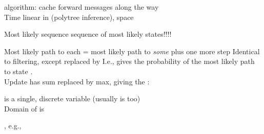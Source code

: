 \documentclass{article}
\begin{document}
\begin{huge}
\vspace*{0.01in}

\textwidth
{}

 algorithm: cache forward messages along the way\\
Time linear in  (polytree inference), space 




Most likely sequence \mat{$\neq$} sequence of most likely states!!!!

Most likely path to each \al
  = most likely path to \emph{some}  plus one more step
Identical to filtering, except  replaced by
\mat{\[ 
  \m_{1:t} = \max_{\sx_1\ldots\sx_{t-1}} \pv(\x_1,\ldots,\x_{t-1},\X_t | \e_{1:t}),
\]}
I.e.,  gives the probability of the most likely path to state .\\
Update has sum replaced by max, giving the :
\mat{\[
  \m_{1:t+1} = \pv(\e_{t+1} | \X_{t+1})  \max_{\sx_t}\left(
            \pv(\X_{t+1} | \x_t) \m_{1:t}\right)
\]}



\vspace{0.3in}

\textwidth
{}



 is a single, discrete variable (usually  is too)\\
Domain of  is 

 , e.g., 


\end{huge}
\end{document}
